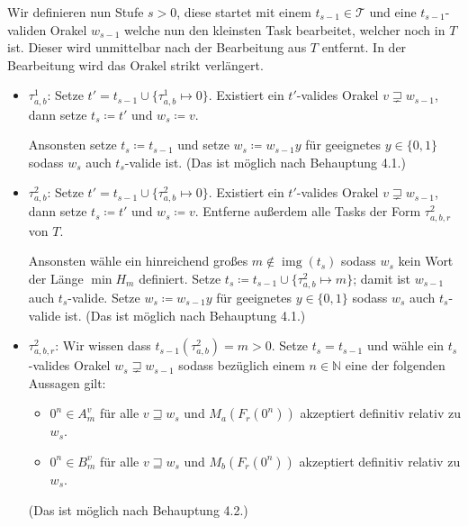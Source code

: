 \documentclass[nofonts]{uebung}
\theoremstyle{definition}
\DeclareMathOperator{\img}{img}
\begin{document}
Wir definieren nun Stufe $s>0$, diese startet mit einem $t_{s-1}\in\mathcal T$ und eine $t_{s-1}$-validen Orakel $w_{s-1}$ welche nun den kleinsten Task bearbeitet, welcher noch in $T$ ist. Dieser wird unmittelbar nach der Bearbeitung aus $T$ entfernt. In der Bearbeitung wird das Orakel strikt verlängert.
\begin{itemize}

    \item $\tau^1_{a,b}$: Setze $t'=t_{s-1}\cup\{\tau^1_{a,b}\mapsto 0\}$. Existiert ein $t'$-valides Orakel $v\sqsupsetneq w_{s-1}$, dann setze $t_s\coloneqq t'$ und $w_s\coloneqq v$.

        Ansonsten setze $t_s\coloneqq t_{s-1}$ und setze $w_s\coloneqq w_{s-1}y$ für geeignetes $y\in\{0,1\}$ sodass $w_s$ auch $t_s$-valide ist. (Das ist möglich nach Behauptung 4.1.)

    \item $\tau^2_{a,b}$: Setze $t'=t_{s-1}\cup\{\tau^2_{a,b}\mapsto 0\}$. Existiert ein $t'$-valides Orakel $v\sqsupsetneq w_{s-1}$, dann setze $t_s\coloneqq t'$ und $w_s\coloneqq v$. Entferne außerdem alle Tasks der Form $\tau^2_{a,b,r}$ von $T$.

        Ansonsten wähle ein hinreichend großes $m\not\in \img(t_s)$ sodass $w_s$ kein Wort der Länge $\min H_m$ definiert. Setze $t_s\coloneqq t_{s-1}\cup \{ \tau^2_{a,b}\mapsto m \}$; damit ist $w_{s-1}$ auch $t_s$-valide. Setze $w_s\coloneqq w_{s-1}y$ für geeignetes $y\in\{0,1\}$ sodass $w_s$ auch $t_s$-valide ist. (Das ist möglich nach Behauptung 4.1.)

    \item $\tau^2_{a,b,r}$: Wir wissen dass $t_{s-1}(\tau^2_{a,b})=m>0$. Setze $t_s=t_{s-1}$ und wähle ein $t_s$-valides Orakel $w_s\sqsupsetneq w_{s-1}$ sodass bezüglich einem $n\in\mathbb N$ eine der folgenden Aussagen gilt:
        \begin{itemize}[nosep,endpenalty=10000]
            \item $0^n\in A_m^v$ für alle $v\sqsupseteq w_s$ und $M_a(F_r(0^n))$ akzeptiert definitiv relativ zu $w_s$.
            \item $0^n\in B_m^v$ für alle $v\sqsupseteq w_s$ und $M_b(F_r(0^n))$ akzeptiert definitiv relativ zu $w_s$.
        \end{itemize} (Das ist möglich nach Behauptung 4.2.)
\end{itemize}
\end{document}
